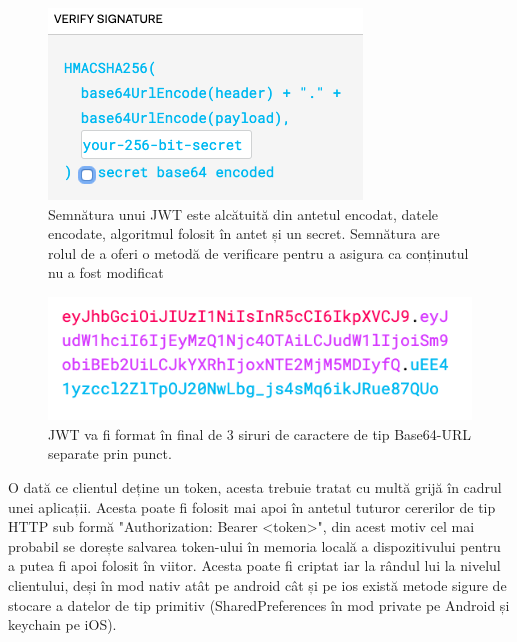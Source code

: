 \documentclass[12pt]{article}
\begin{document}
\begin{figure}[H]
    \begin{minipage}[c]{0.5\textwidth}
        \includegraphics[width=\textwidth]{jwt-sign.png}
    \end{minipage}\hfill
    \begin{minipage}[c]{0.5\textwidth}
        \caption{Semnătura unui JWT este alcătuită din antetul encodat, 
        datele encodate, algoritmul folosit în antet și un secret. Semnătura are rolul
        de a oferi o metodă de verificare pentru a asigura ca conținutul nu a fost 
        modificat }
    \end{minipage}
\end{figure}

\begin{figure}[H]
    \begin{minipage}[c]{0.5\textwidth}
        \includegraphics[width=\textwidth]{jwt-all.png}
    \end{minipage}\hfill
    \begin{minipage}[c]{0.5\textwidth}
        \caption{
            JWT va fi format în final 
            de 3 siruri de caractere de tip Base64-URL separate prin punct. }
    \end{minipage}
\end{figure}

O dată ce clientul deține un token, acesta trebuie tratat cu multă grijă 
în cadrul unei aplicații. Acesta poate fi folosit mai apoi în antetul tuturor 
cererilor de tip HTTP sub formă "Authorization: Bearer <token>", din acest motiv 
cel mai probabil se dorește salvarea token-ului în memoria locală a dispozitivului
pentru a putea fi apoi folosit în viitor. Acesta poate fi criptat iar la rândul 
lui la nivelul clientului, deși în mod nativ atât pe android cât și pe ios există metode
sigure de stocare a datelor de tip primitiv (SharedPreferences în mod private pe Android și
keychain pe iOS).
\end{document}
